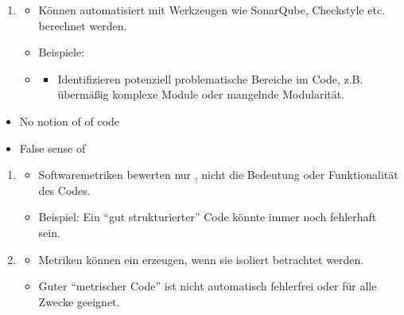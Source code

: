 \begin{infoBox}[title=Vorteile von Softwaremetriken]
    \begin{enumerate}
        \item {}
        \begin{itemize}
            \item Können automatisiert mit Werkzeugen wie SonarQube, Checkstyle etc. berechnet werden.
            \item Beispiele: 
            \item {}
            \begin{itemize}
                \item Identifizieren potenziell problematische Bereiche im Code, z.B. übermäßig komplexe Module oder mangelnde Modularität.
            \end{itemize}
        \end{itemize}
    \end{enumerate}
\end{infoBox}
\begin{defBox}[title=Software Metrics Contra]
    \begin{itemize}
        \item No notion of  of code
        \item False sense of 
    \end{itemize}
\end{defBox}
\begin{infoBox}[tile=Nachteile von Softwaremetriken]
    \begin{enumerate}
        \item {}
        \begin{itemize}
            \item Softwaremetriken bewerten nur , nicht die Bedeutung oder Funktionalität des Codes.
            \item Beispiel: Ein \enquote{gut strukturierter} Code könnte immer noch fehlerhaft sein.
        \end{itemize}
        \item {}
        \begin{itemize}
            \item Metriken können ein  erzeugen, wenn sie isoliert betrachtet werden.
            \item Guter \enquote{metrischer Code} ist nicht automatisch fehlerfrei oder für alle Zwecke geeignet.
        \end{itemize}
    \end{enumerate}
\end{infoBox}
